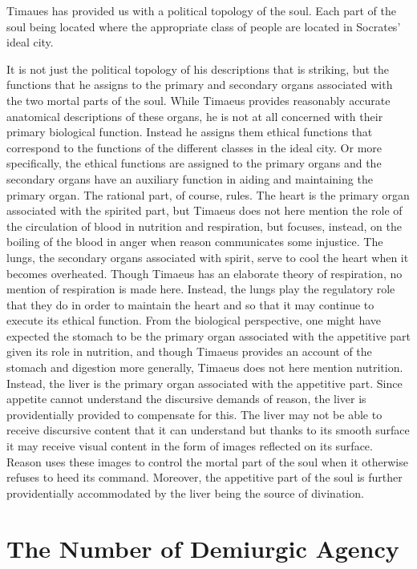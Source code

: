 Timaues has provided us with a political topology of the soul. Each part of the soul being located where the appropriate class of people are located in Socrates' ideal city.

It is not just the political topology of his descriptions that is striking, but the functions that he assigns to the primary and secondary organs associated with the two mortal parts of the soul. While Timaeus provides reasonably accurate anatomical descriptions of these organs, he is not at all concerned with their primary biological function. Instead he assigns them ethical functions that correspond to the functions of the different classes in the ideal city. Or more specifically, the ethical functions are assigned to the primary organs and the secondary organs have an auxiliary function in aiding and maintaining the primary organ. The rational part, of course, rules. The heart is the primary organ associated with the spirited part, but Timaeus does not here mention the role of the circulation of blood in nutrition and respiration, but focuses, instead, on the boiling of the blood in anger when reason communicates some injustice. The lungs, the secondary organs associated with spirit, serve to cool the heart when it becomes overheated. Though Timaeus has an elaborate theory of respiration, no mention of respiration is made here. Instead, the lungs play the regulatory role that they do in order to maintain the heart and so that it may continue to execute its ethical function. From the biological perspective, one might have expected the stomach to be the primary organ associated with the appetitive part given its role in nutrition, and though Timaeus provides an account of the stomach and digestion more generally, Timaeus does not here mention nutrition. Instead, the liver is the primary organ associated with the appetitive part. Since appetite cannot understand the discursive demands of reason, the liver is providentially provided to compensate for this. The liver may not be able to receive discursive content that it can understand but thanks to its smooth surface it may receive visual content in the form of images reflected on its surface. Reason uses these images to control the mortal part of the soul when it otherwise refuses to heed its command. Moreover, the appetitive part of the soul is further providentially accommodated by the liver being the source of divination.


\section{The Number of Demiurgic Agency} %
\label{sec:the_number_of_demiurgic_agency}

